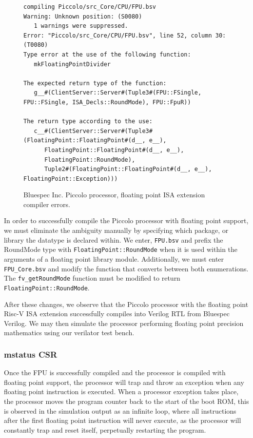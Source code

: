 \documentclass[a4paper,8pt]{report}
\begin{document}
\begin{figure}[h]
\scriptsize
\begin{verbatim}
compiling Piccolo/src_Core/CPU/FPU.bsv
Warning: Unknown position: (S0080)
   1 warnings were suppressed.
Error: "Piccolo/src_Core/CPU/FPU.bsv", line 52, column 30: (T0080)
Type error at the use of the following function:
   mkFloatingPointDivider

The expected return type of the function:
   g__#(ClientServer::Server#(Tuple3#(FPU::FSingle, FPU::FSingle, ISA_Decls::RoundMode), FPU::FpuR))

The return type according to the use:
   c__#(ClientServer::Server#(Tuple3#(FloatingPoint::FloatingPoint#(d__, e__),
      FloatingPoint::FloatingPoint#(d__, e__),
      FloatingPoint::RoundMode),
      Tuple2#(FloatingPoint::FloatingPoint#(d__, e__), FloatingPoint::Exception)))
\end{verbatim}
\normalsize
\caption{Bluespec Inc. Piccolo processor, floating point ISA extension compiler errors.}
\end{figure}

In order to successfully compile the Piccolo processor with floating point
support, we must eliminate the ambiguity manually by specifying which package,
or library the datatype is declared within. We enter, \texttt{FPU.bsv} and prefix the
RoundMode type with \texttt{FloatingPoint::RoundMode} when it is used within the
arguments of a floating point library module. Additionally, we must enter
\texttt{FPU\_Core.bsv} and modify the function that converts between both
enumerations. The \texttt{fv\_getRoundMode} function must be modified to return
\texttt{FloatingPoint::RoundMode}.

After these changes, we observe that the Piccolo processor with the
floating point Risc-V ISA extension successfully compiles into Verilog RTL from
Bluespec Verilog. We may then simulate the processor performing floating point
precision mathematics using our verilator test bench.

\subsubsection{mstatus CSR}
Once the FPU is successfully compiled and the processor is compiled with
floating point support, the processor will trap and throw an exception when any
floating point instruction is executed. When a processor exception takes place,
the processor moves the program counter back to the start of the boot ROM, this
is observed in the simulation output as an infinite loop, where all instructions
after the first floating point instruction will never execute, as the processor
will constantly trap and reset itself, perpetually restarting the program.
\end{document}
